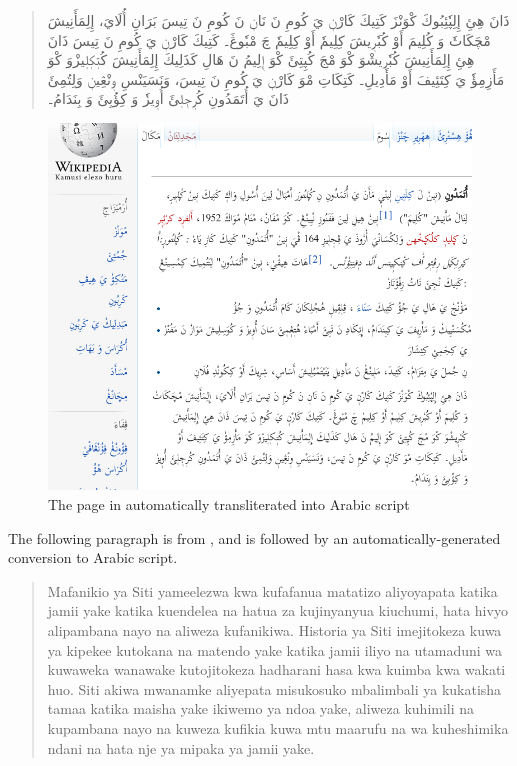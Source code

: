 \begin{quotation}
\begin{Arabic}
ذَانَ هِئِ إِلِپٗئِبُوكَ كْوَنْزَ كَتِيكَ كَارْنٖ يَ كُومِ نَ نَانٖ نَ كُومِ نَ تِيسَ بَرَانِ أُلَايَ، إِلِمَأَنِيشَ مْچَكَاتٗ وَ كُلِيمَ أَوْ كُبٗرٖيشَ كِلِيمٗ أَوْ كِلِيمٗ چَ مْبٗوڠَ۔ كَتِيكَ كَارْنٖ يَ كُومِ نَ تِيسَ ذَانَ هِئِ إِلِمَأَنِيشَ كُبٗرٖيشْوَ كْوَ مْجَ كُپِتِئَ كْوَ إٖلِيمُ نَ هَالِ كَذَلِيكَ إِلِمَأَنِيشَ كُتٖكٖلٖيزْوَ كْوَ مَأَزِمِؤٗ يَ كِتَئِيفَ أَوْ مَأَدِيلِ۔ كَتِكَاتِ مْوَ كَارْنٖ يَ كُومِ نَ تِيسَ، وَنَسَيَنْسِ وٖنْڠِينٖ وَلِتُمِئَ ذَانَ يَ أُتَمَدُونِ كُرٖجٖلٖئَ أُوٖيزٗ وَ كِؤُبِئَ وَ بِنَدَامُ۔
\end{Arabic}
\end{quotation}

\begin{figure}[H]
\centering
\includegraphics[keepaspectratio=true, scale=0.8]{./images/utamaduni_ar.png}
\caption{The page in  automatically transliterated into Arabic script}
\label{fig:wikiA}
\end{figure}

The following paragraph is from \citet{Hamad2011}, and is followed by an automatically-generated conversion to Arabic script.

\begin{quotation}
Mafanikio ya Siti yameelezwa kwa kufafanua matatizo aliyoyapata katika jamii yake katika kuendelea na hatua za kujinyanyua kiuchumi, hata hivyo alipambana nayo na aliweza kufanikiwa. Historia ya Siti imejitokeza kuwa ya kipekee kutokana na matendo yake katika jamii iliyo na utamaduni wa kuwaweka wanawake kutojitokeza hadharani hasa kwa kuimba kwa wakati huo. Siti akiwa mwanamke aliyepata misukosuko mbalimbali ya kukatisha tamaa katika maisha yake ikiwemo ya ndoa yake, aliweza kuhimili na kupambana nayo na kuweza kufikia kuwa mtu maarufu na wa kuheshimika ndani na hata nje ya mipaka ya jamii yake.
\end{quotation}

